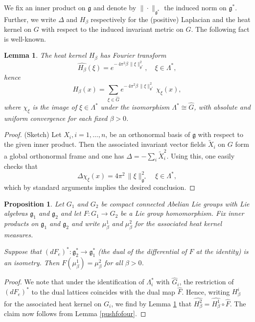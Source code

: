 \documentclass[11pt,reqno]{amsart}
\numberwithin{equation}{section}
\newtheorem{lemma}[theorem]{Lemma}
\newtheorem{proposition}[theorem]{Proposition}
\theoremstyle{remark}
\theoremstyle{rmdefinition}
\begin{document}
We fix an inner product on $\mathfrak g$ and denote by $\| \cdot \|_{ \mathfrak g^*}$ the induced norm on  $\mathfrak g^*$. Further, we write $\Delta$ and $H_{\beta}$ respectively for the (positive) Laplacian and the heat kernel on $G$ with respect to the induced invariant metric on $G$. The following fact is well-known.
\begin{lemma}\label{hetkerexpa}
The heat kernel $H_{\beta}$ has Fourier transform $$\widehat{H_{\beta}}(\xi) = e^{-\,4\pi^2 \beta\,\|\xi\|_{\mathfrak g^*}^{2}},\quad \xi\in \Lambda^*,$$ hence
\[
H_{\beta}(x) = \sum_{\xi\in\widehat{G}} e^{-\,4\pi^2 \beta\,\|\xi\|_{\mathfrak g^*}^{2}}\,\chi_\xi(x),
\]
where $ \chi_\xi$ is the image of $\xi \in \Lambda^*$ under the isomorphism  $\Lambda^*\cong \widehat{G}$, with absolute and uniform convergence for each fixed $\beta>0$.
\end{lemma}
\begin{proof} (Sketch)
Let $X_i, i=1,\ldots, n$, be an orthonormal basis of $\mathfrak g$ with respect to the given inner product. Then the associated invariant vector fields $\widetilde X_i$ on $G$ form a global orthonormal frame and one has
$ \Delta=-\sum_i \widetilde X^2_i$. Using this, one easily checks that 
$$ 
\Delta \chi_\xi(x) = 4\pi^2\,\|\xi\|_{\mathfrak g^\ast}^2 
\quad \xi \in  \Lambda^*,
$$
which by standard arguments implies the desired conclusion.
\end{proof}
\begin{proposition}\label{hetkertoushp}
Let $G_1$ and $G_2$ be compact connected Abelian Lie groups with Lie algebras $\mathfrak g_1$ and $\mathfrak g_2$ and let $F: G_1 \rightarrow G_2$ be a Lie group homomorphism. Fix inner products on $\mathfrak g_1$ and $\mathfrak g_2$ and write $\mu^1_\beta$ and $\mu^2_\beta$ for the associated heat kernel measures.

Suppose that $(dF_e)^*: \mathfrak g^*_2 \rightarrow \mathfrak g^*_1$ (the dual of the differential of $F$ at the identity) is an isometry. Then $F(\mu^1_\beta)=\mu^2_\beta$ for all $\beta >0$.
\end{proposition}
\begin{proof}
We note that under the identification of $\Lambda^*_i$ with $\widehat{G}_i$, the restriction of $(dF_e)^*$ to the dual lattices coincides with the dual map $\widehat{F}$. Hence,
writing $H_{\beta}^i$ for the associated heat kernel on $G_i$, we find by Lemma \ref{hetkerexpa} that $\widehat{H_{\beta}^2}=\widehat{H_{\beta}^1} \circ \widehat{F}$. The claim now follows from Lemma \ref{pushfofour}.
\end{proof}
\end{document}

